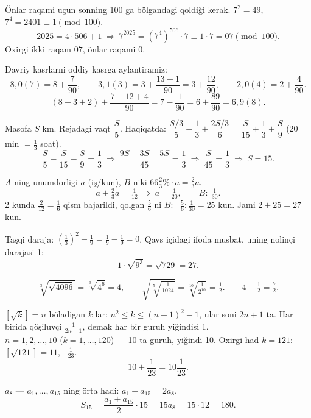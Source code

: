 




Önlar raqami uçun sonning 100 ga bölgandagi qoldiği kerak. $7^2=49$, \ $7^4=2401\equiv1\pmod{100}$.
\[2025=4\cdot506+1\ \Rightarrow\ 7^{2025}=\left(7^4\right)^{506}\cdot7\equiv1\cdot7=07\pmod{100}.\]
Oxirgi ikki raqam $07$, önlar raqami $0$.

Davriy kasrlarni oddiy kasrga aylantiramiz:
\[8{,}0(7)=8+\frac{7}{90},\qquad 3{,}1(3)=3+\frac{13-1}{90}=3+\frac{12}{90},\qquad 2{,}0(4)=2+\frac{4}{90}.\]
\[(8-3+2)+\frac{7-12+4}{90}=7-\frac1{90}=6+\frac{89}{90}=6{,}9(8).\]

Masofa $S$ km. Rejadagi vaqt $\dfrac S5$. Haqiqatda: $\dfrac{S/3}{5}+\dfrac13+\dfrac{2S/3}{6}=\dfrac S{15}+\dfrac13+\dfrac S9$ (20 min $=\frac13$ soat).
\[\frac S5-\frac S{15}-\frac S9=\frac13\ \Rightarrow\ \frac{9S-3S-5S}{45}=\frac13\ \Rightarrow\ \frac S{45}=\frac13\ \Rightarrow\ S=15.\]

$A$ ning unumdorligi $a$ (iş/kun), $B$ niki $66\frac23\%\cdot a=\frac23a$.
\[a+\tfrac23a=\tfrac1{12}\ \Rightarrow\ a=\tfrac1{20},\qquad B:\ \tfrac1{30}.\]
2 kunda $\frac2{12}=\frac16$ qism bajarildi, qolgan $\frac56$ ni $B$: \ $\frac56:\frac1{30}=25$ kun. Jami $2+25=27$ kun.

Taşqi daraja: $\left(\frac13\right)^2-\frac19=\frac19-\frac19=0$. Qavs içidagi ifoda musbat, uning nolinçi darajasi 1:
\[1\cdot\sqrt{9^3}=\sqrt{729}=27.\]

\[\sqrt[3]{\sqrt{4096}}=\sqrt[6]{4^6}=4,\qquad \sqrt{\sqrt[5]{\tfrac1{1024}}}=\sqrt[10]{\tfrac1{2^{10}}}=\tfrac12.\qquad 4-\tfrac12=\tfrac72.\]

$[\sqrt k]=n$ böladigan $k$ lar: $n^2\le k\le(n+1)^2-1$, ular soni $2n+1$ ta. Har birida qöşiluvçi $\frac1{2n+1}$, demak har bir guruh yiğindisi 1.\\
$n=1,2,\dots,10$ ($k=1,\dots,120$) — 10 ta guruh, yiğindi 10. Oxirgi had $k=121$: $[\sqrt{121}]=11$, \ $\frac1{23}$.
\[10+\frac1{23}=10\frac1{23}.\]

$a_8$ — $a_1,\dots,a_{15}$ ning örta hadi: $a_1+a_{15}=2a_8$.
\[S_{15}=\frac{a_1+a_{15}}2\cdot15=15a_8=15\cdot12=180.\]

